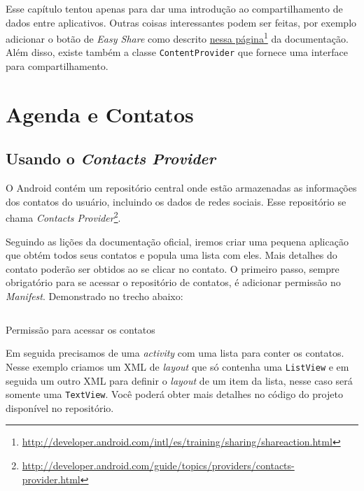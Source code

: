 \documentclass[a4paper,12pt,brazil,oneside]{book}
\begin{document}
\begin{singlespace}
		Esse capítulo tentou apenas para dar uma introdução ao compartilhamento de dados entre aplicativos. Outras coisas interessantes podem ser feitas, por exemplo adicionar o botão de \emph{Easy Share} como descrito \href{http://developer.android.com/intl/es/training/sharing/shareaction.html}{nessa página}\footnote{\href{http://developer.android.com/intl/es/training/sharing/shareaction.html}{http://developer.android.com/intl/es/training/sharing/shareaction.html}} da documentação. Além disso, existe também a classe \texttt{ContentProvider} que fornece uma interface para compartilhamento.

\chapter{Agenda e Contatos} 
	\section{Usando o \emph{Contacts Provider}}

	O Android contém um repositório central onde estão armazenadas as informações dos contatos do usuário, incluindo os dados de redes sociais. Esse repositório se chama \emph{Contacts Provider}\footnote{\href{http://developer.android.com/guide/topics/providers/contacts-provider.html}{http://developer.android.com/guide/topics/providers/contacts-provider.html}}.	
	
	Seguindo as lições da documentação oficial, iremos criar uma pequena aplicação que obtém todos seus contatos e popula uma lista com eles. Mais detalhes do contato poderão ser obtidos ao se clicar no contato. O primeiro passo, sempre obrigatório para se acessar o repositório de contatos, é adicionar permissão no \emph{Manifest}. Demonstrado no trecho abaixo:	

		\begin{listing}[H]
		\inputminted[linenos=true,fontsize=\small,frame=lines, framesep=2mm, tabsize=2,numbersep=5pt]{xml}{src/api/contacts/permission.xml}
		\caption{Permissão para acessar os contatos}
		\label{code:contactpermission}
		\end{listing} 	
	
	Em seguida precisamos de uma \emph{activity} com uma lista para conter os contatos. Nesse exemplo criamos um XML de \emph{layout} que só contenha uma \texttt{ListView} e em seguida um outro XML para definir o \emph{layout} de um item da lista, nesse caso será somente uma \texttt{TextView}. Você poderá obter mais detalhes no código do projeto disponível no repositório.


\end{singlespace}
\end{document}
